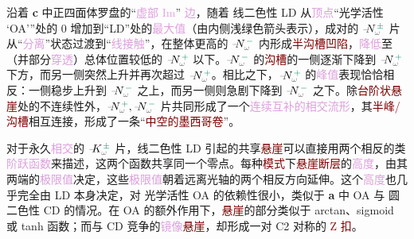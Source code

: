 沿着 \textbf{c} 中\textcolor{NavyBlue}{正四面体罗盘}的“\textcolor{Plum}{虚部 Im}” \textcolor{Plum}{边}，随着 \textcolor{NavyBlue}{线二色性 LD} 从\textcolor{Plum}{顶点}“\textcolor{NavyBlue}{光学活性 `OA'}”处的 0 增加到“\textcolor{NavyBlue}{LD}”处的\textcolor{Plum}{最大值}（由内侧浅绿色箭头表示），成对的 $\Xint{\mathcolor{gray}{-}}{10}{N}^{\;\!\textcolor{PineGreen}{\pm}}_{\mathcolor{gray}{\omega}}$ 片从“\textcolor{Plum}{分离}”状态过渡到“\textcolor{Plum}{线接触}”，在整体更高的 $\Xint{\mathcolor{gray}{-}}{10}{N}^{\;\!\textcolor{PineGreen}{-}}_{\mathcolor{gray}{\omega}}$ 内形成\textcolor{Maroon}{半沟槽凹陷}，\textcolor{Plum}{降低}至（并部分\textcolor{Plum}{穿透}）总体位置较低的 $\Xint{\mathcolor{gray}{-}}{10}{N}^{\;\!\textcolor{PineGreen}{+}}_{\mathcolor{gray}{\omega}}$ 以下。$\Xint{\mathcolor{gray}{-}}{10}{N}^{\;\!\textcolor{PineGreen}{-}}_{\mathcolor{gray}{\omega}}$ 的\textcolor{Maroon}{沟槽}的一侧逐渐下降到 $\Xint{\mathcolor{gray}{-}}{10}{N}^{\;\!\textcolor{PineGreen}{+}}_{\mathcolor{gray}{\omega}}$ 下方，而另一侧突然上升并再次超过 $\Xint{\mathcolor{gray}{-}}{10}{N}^{\;\!\textcolor{PineGreen}{+}}_{\mathcolor{gray}{\omega}}$。相比之下，$\Xint{\mathcolor{gray}{-}}{10}{N}^{\;\!\textcolor{PineGreen}{+}}_{\mathcolor{gray}{\omega}}$ 的\textcolor{Plum}{峰值}表现恰恰相反：一侧稳步上升到 $\Xint{\mathcolor{gray}{-}}{10}{N}^{\;\!\textcolor{PineGreen}{-}}_{\mathcolor{gray}{\omega}}$ 之上，而另一侧则急剧下降到 $\Xint{\mathcolor{gray}{-}}{10}{N}^{\;\!\textcolor{PineGreen}{-}}_{\mathcolor{gray}{\omega}}$ 之下。除\textcolor{Maroon}{台阶状悬崖}处的不连续性外，$\Xint{\mathcolor{gray}{-}}{10}{N}^{\;\!\textcolor{PineGreen}{+}}_{\mathcolor{gray}{\omega}}, \Xint{\mathcolor{gray}{-}}{10}{N}^{\;\!\textcolor{PineGreen}{-}}_{\mathcolor{gray}{\omega}}$ 片共同形成了一个\textcolor{Plum}{连续互补的相交流形}，其\textcolor{Maroon}{半峰/沟槽}相互连接，形成了一条“\textcolor{Maroon}{中空的墨西哥卷}”。

对于永久\textcolor{Plum}{相交}的 $\Xint{\mathcolor{gray}{-}}{10}{K}^{\;\!\textcolor{PineGreen}{\pm}}_{\mathcolor{gray}{\omega}}$ 片，\textcolor{NavyBlue}{线二色性 LD} 引起的共享\textcolor{Maroon}{悬崖}可以直接用两个相反的类\textcolor{Plum}{阶跃函数}来描述，这两个函数共享同一个零点。每种\textcolor{Maroon}{模式}下\textcolor{Maroon}{悬崖断层}的\textcolor{Plum}{高度}，由其两端的\textcolor{Plum}{极限值}决定，这些\textcolor{Plum}{极限值}朝着远离\textcolor{PineGreen}{光轴}的两个相反方向延伸。这个\textcolor{Plum}{高度}也几乎完全由 \textcolor{NavyBlue}{LD} 本身决定，对 \textcolor{NavyBlue}{光学活性 OA} 的依赖性很小，类似于 \textbf{a} 中 \textcolor{NavyBlue}{OA} 与 \textcolor{NavyBlue}{圆二色性 CD} 的情况。在 \textcolor{NavyBlue}{OA} 的额外作用下，\textcolor{Maroon}{悬崖}的部分类似于 arctan、sigmoid 或 tanh 函数；而与 \textcolor{NavyBlue}{CD} 竞争的\textcolor{Plum}{镜像}\textcolor{Maroon}{悬崖}，却形成一对 \textcolor{NavyBlue}{C2 对称}的 \textcolor{Maroon}{Z 扣}。

